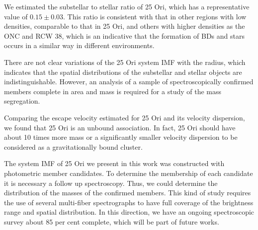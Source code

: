 \documentclass[12pt]{article}
\begin{document}
We estimated the substellar to stellar ratio of 25 Ori, which has a representative value of $0.15\pm0.03$. This ratio is consistent with that in other regions with low densities, comparable to that in 25 Ori, and others with higher densities as the ONC and RCW 38, which is an indicative that the formation of BDs and stars occurs in a similar way in different environments.

There are not clear variations of the 25 Ori system IMF with the radius, which indicates that the spatial distributions of the substellar and stellar objects are indistinguishable. However, an analysis of a sample of spectroscopically confirmed members complete in area and mass is required for a study of the mass segregation.

Comparing the escape velocity estimated for 25 Ori and its velocity dispersion, we found that 25 Ori is an unbound association. In fact, 25 Ori should have about 10 times more mass or a significantly smaller velocity dispersion to be considered as a gravitationally bound cluster.

The system IMF of 25 Ori we present in this work was constructed with photometric member candidates. To determine the membership of each candidate it is necessary a follow up spectroscopy. Thus, we could determine the distribution of the masses of the confirmed members. This kind of study requires the use of several multi-fiber spectrographs to have full coverage of the brightness range and spatial distribution. In this direction, we have an ongoing spectroscopic survey about 85 per cent complete, which will be part of future works. 
\end{document}
